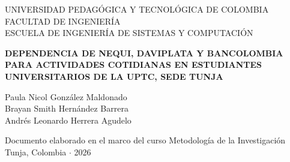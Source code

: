 \begin{titlepage}
    \centering
    \begin{singlespace}
        UNIVERSIDAD PEDAGÓGICA Y TECNOLÓGICA DE COLOMBIA\\
        FACULTAD DE INGENIERÍA\\
        ESCUELA DE INGENIERÍA DE SISTEMAS Y COMPUTACIÓN

        \vfill %

        {\bfseries DEPENDENCIA DE NEQUI, DAVIPLATA Y BANCOLOMBIA
        PARA ACTIVIDADES COTIDIANAS EN ESTUDIANTES
        UNIVERSITARIOS DE LA UPTC, SEDE TUNJA}

        \vfill


        Paula Nicol González Maldonado\\
        Brayan Smith Hernández Barrera\\
        Andrés Leonardo Herrera Agudelo


        \vfill

        Documento elaborado en el marco del curso Metodología de la Investigación\\[0.5em]
        Tunja, Colombia $\cdot$ 2026
    \end{singlespace}
\end{titlepage}
